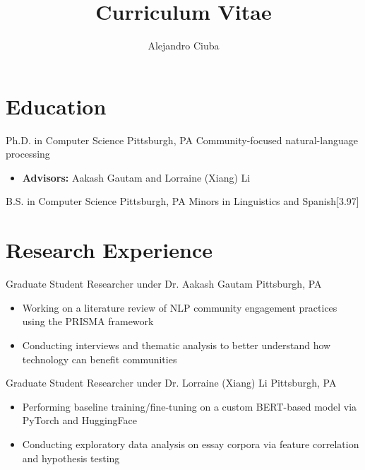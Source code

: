 \documentclass[11pt]{tianyicv}
\title{Curriculum Vitae}
\author{Alejandro Ciuba}
\begin{document}
\maketitle

\section{Education}

{Ph.D. in Computer Science}
{Pittsburgh, PA}{}
{Community-focused natural-language processing}{
    \begin{itemize}
        \item \textbf{Advisors:} Aakash Gautam and Lorraine (Xiang) Li 
    \end{itemize}
}

{B.S. in Computer Science}
{Pittsburgh, PA}{}
{Minors in Linguistics and Spanish}{}[3.97]


\section{Research Experience}

{Graduate Student Researcher under Dr. Aakash Gautam}
{Pittsburgh, PA}{}{
    \begin{itemize}
        \item Working on a literature review of NLP community engagement practices using the PRISMA framework
        \item Conducting interviews and thematic analysis to better understand how technology can benefit communities
    \end{itemize}
}

{Graduate Student Researcher under Dr. Lorraine (Xiang) Li}
{Pittsburgh, PA}{} {
    \begin{itemize}
        \item Performing baseline training/fine-tuning on a custom BERT-based model via PyTorch and HuggingFace 
        \item Conducting exploratory data analysis on essay corpora via feature correlation and hypothesis testing
    \end{itemize}
}
\end{document}
